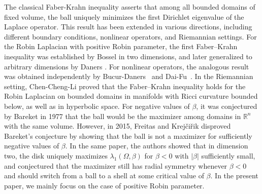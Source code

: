 \documentclass[11pt,leqno]{amsart}
\def\l{\lambda}
\numberwithin{equation}{section}
\begin{document}
The classical Faber-Krahn  inequality asserts that among all bounded domains of fixed volume, the ball uniquely minimizes the first Dirichlet eigenvalue of the Laplace operator. This result has been extended in various directions, including different boundary conditions, nonlinear operators, and Riemannian settings. For the Robin Laplacian with positive Robin parameter, the first Faber–Krahn inequality was established by Bossel \cite{BosselCR, BosselZAMP}  in two dimensions, and later generalized to arbitrary dimensions by Daners \cite{DanersMathann}. For nonlinear operators, the analogous result was obtained independently by Bucur-Daners~\cite{BucurCV} and Dai-Fu~\cite{Dai2011}. In the Riemannian setting, Chen-Cheng-Li \cite{ChendaguangJDE} proved that the Faber–Krahn inequality holds for the Robin Laplacian on bounded domains in manifolds with Ricci curvature bounded below, as well as in hyperbolic space.
For negative values of $\beta$, it was conjectured by Bareket \cite{Bar77} in 1977 that the ball would be the maximizer among domains in $\mathbb{R}^n$ with the same volume. However, in 2015, Freitas and  Krej\v{c}i\v{r}{i}k \cite{FK15} disproved Bareket's conjecture by showing that the ball is not a maximizer for sufficiently negative values of $\beta$. In the same paper, the authors showed that in dimension two, the disk uniquely maximizes $\l_{1}(\Omega, \beta)$ for $\beta <0$ with $|\beta|$ sufficiently small, and conjectured that the maximizer still has radial symmetry whenever $\beta<0$ and should switch from a ball to a shell at some critical value of $\beta$. In the present paper, we mainly focus on the case of positive Robin parameter.



\end{document}
